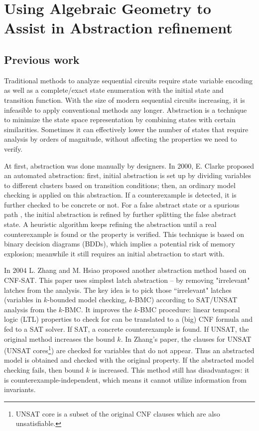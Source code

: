 \section{Using Algebraic Geometry to Assist in Abstraction refinement}
\subsection{Previous work}
Traditional methods to analyze sequential circuits require state variable encoding
as well as a complete/exact state enumeration with the initial state and transition function.
With the size of modern sequential circuits increasing, it is infeasible to apply conventional methods
any longer. Abstraction is a technique to minimize the state space representation by combining states with certain 
similarities. Sometimes it can effectively lower the number of states that require analysis by orders of magnitude,
without affecting the properties we need to verify.

At first, abstraction was done manually by designers. In 2000, E. Clarke \cite{clarke2000counterexample}
proposed an automated abstraction: first,
initial abstraction is set up by dividing variables to different clusters based on transition conditions;
then, an ordinary model checking is applied on this abstraction. If a counterexample is detected, 
it is further checked to be concrete or not. For a false abstract state or a spurious path 
, the initial abstraction is refined by further splitting the false abstract state. 
A heuristic algorithm keeps refining the abstraction until a real counterexample is found or the 
property is verified. This technique is based on binary decision diagrams (BDDs), which implies a
potential risk of memory explosion; meanwhile it still requires an initial abstraction to start with.

In 2004 L. Zhang and M. Hsiao \cite{zhang2005design} proposed another abstraction method based on CNF-SAT.
This paper uses simplest latch abstraction -- by removing "irrelevant" latches from the analysis. 
The key idea is to pick those ``irrelevant" latches (variables in $k$-bounded model checking, $k$-BMC) 
according to SAT/UNSAT analysis from the $k$-BMC. It improves the $k$-BMC procedure\cite{biere1999symbolic}: 
linear temporal logic (LTL) properties to check for can be translated to a (big) CNF formula and fed to a SAT solver. 
If SAT, a concrete counterexample is found. 
If UNSAT, the original method increases the bound $k$. In Zhang's paper, the clauses for UNSAT 
(UNSAT cores\footnote{UNSAT core is a subset of the original CNF clauses which are also unsatisfiable.})
are checked for variables that do not appear.
Thus an abstracted model is obtained and checked with the original property. If the abstracted model checking fails, 
then bound $k$ is increased. This method still has disadvantages: it is counterexample-independent,
which means it cannot utilize information from invariants.

